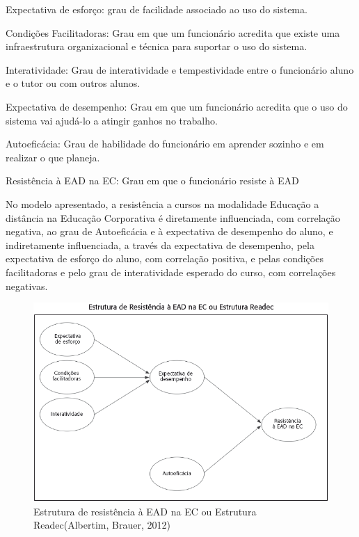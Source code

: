 Expectativa de esforço: grau de facilidade associado ao uso do sistema.

Condições Facilitadoras: Grau em que um funcionário acredita que existe uma infraestrutura organizacional e técnica para suportar o uso do sistema.

Interatividade: Grau de interatividade e tempestividade entre o funcionário aluno e o tutor ou com outros alunos.

Expectativa de desempenho: Grau em que um funcionário acredita que o uso do sistema vai ajudá-lo a atingir ganhos no trabalho.

Autoeficácia: Grau de habilidade do funcionário em aprender sozinho e em realizar o que planeja.

Resistência à EAD na EC: Grau em que o funcionário resiste à EAD

No modelo apresentado, a resistência a cursos na modalidade Educação a distância na Educação Corporativa é diretamente influenciada, com correlação negativa, ao grau de Autoeficácia e à expectativa de desempenho do aluno, e indiretamente influenciada, a través da expectativa de desempenho, pela expectativa de esforço do aluno, com correlação positiva, e pelas condições facilitadoras e pelo grau de interatividade esperado do curso, com correlações negativas.

\begin{figure}
            \begin{center}
                \includegraphics[width=1\textwidth]{Readec.png}
            \end{center}
            \caption{Estrutura de resistência à EAD na EC ou Estrutura Readec(Albertim, Brauer, 2012\cite{Albertin_Brauer_2012})}
            \label{fig:Readec}
\end{figure}

